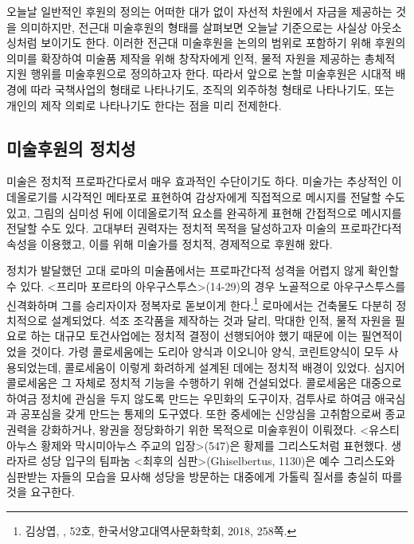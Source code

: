 오늘날 일반적인 후원의 정의는 어떠한 대가 없이 자선적 차원에서 자금을 제공하는 것을 의미하지만, 전근대 미술후원의 형태를 살펴보면 오늘날 기준으로는 사실상 아웃소싱처럼 보이기도 한다. 이러한 전근대 미술후원을 논의의 범위로 포함하기 위해 후원의 의미를 확장하여 미술품 제작을 위해 창작자에게 인적, 물적 자원을 제공하는 총체적 지원 행위를 미술후원으로 정의하고자 한다. 따라서 앞으로 논할 미술후원은 시대적 배경에 따라 국책사업의 형태로 나타나기도, 조직의 외주하청 형태로 나타나기도, 또는 개인의 제작 의뢰로 나타나기도 한다는 점을 미리 전제한다.

\subsection{미술후원의 정치성}

미술은 정치적 프로파간다로서 매우 효과적인 수단이기도 하다. 미술가는 추상적인 이데올로기를 시각적인 메타포로 표현하여 감상자에게 직접적으로 메시지를 전달할 수도 있고, 그림의 심미성 뒤에 이데올로기적 요소를 완곡하게 표현해 간접적으로 메시지를 전달할 수도 있다. 고대부터 권력자는 정치적 목적을 달성하고자 미술의 프로파간다적 속성을 이용했고, 이를 위해 미술가를 정치적, 경제적으로 후원해 왔다.

정치가 발달했던 고대 로마의 미술품에서는 프로파간다적 성격을 어렵지 않게 확인할 수 있다. <프리마 포르타의 아우구스투스>(14-29)의 경우 노골적으로 아우구스투스를 신격화하며 그를 승리자이자 정복자로 돋보이게 한다.\footnote{김상엽, ,  52호, 한국서양고대역사문화학회, 2018, 258쪽.} 로마에서는 건축물도 다분히 정치적으로 설계되었다. 석조 조각품을 제작하는 것과 달리, 막대한 인적, 물적 자원을 필요로 하는 대규모 토건사업에는 정치적 결정이 선행되어야 했기 때문에 이는 필연적이었을 것이다. 가령 콜로세움에는 도리아 양식과 이오니아 양식, 코린트양식이 모두 사용되었는데, 콜로세움이 이렇게 화려하게 설계된 데에는 정치적 배경이 있었다. 심지어 콜로세움은 그 자체로 정치적 기능을 수행하기 위해 건설되었다. 콜로세움은 대중으로 하여금 정치에 관심을 두지 않도록 만드는 우민화의 도구이자, 검투사로 하여금 애국심과 공포심을 갖게 만드는 통제의 도구였다. 또한 중세에는 신앙심을 고취함으로써 종교 권력을 강화하거나, 왕권을 정당화하기 위한 목적으로 미술후원이 이뤄졌다. <유스티아누스 황제와 막시미아누스 주교의 입장>(547)은 황제를 그리스도처럼 표현했다. 생 라자르 성당 입구의 팀파눔 <최후의 심판>(Ghiselbertus, 1130)은 예수 그리스도와 심판받는 자들의 모습을 묘사해 성당을 방문하는 대중에게 가톨릭 질서를 충실히 따를 것을 요구한다.

